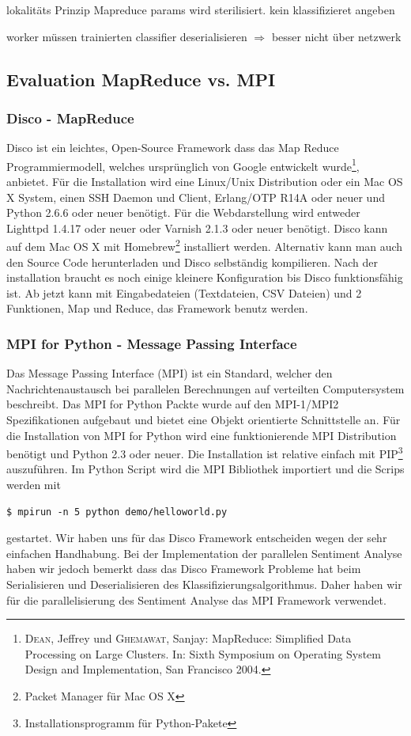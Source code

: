 \documentclass[12pt, oneside]{report}   	%
\begin{document}
lokalitäts Prinzip Mapreduce params wird sterilisiert. kein klassifizieret angeben

worker müssen trainierten classifier deserialisieren $\Rightarrow$ besser nicht über netzwerk
\subsection{Evaluation MapReduce vs. MPI}
\subsubsection{Disco - MapReduce}
Disco ist ein leichtes, Open-Source Framework dass das Map Reduce Programmiermodell, welches ursprünglich von Google entwickelt wurde\footnote{\textsc{Dean}, Jeffrey und \textsc{Ghemawat}, Sanjay: MapReduce: Simplified Data Processing on Large Clusters. In: Sixth Symposium on Operating System Design and Implementation, San Francisco 2004.}, anbietet. Für die Installation wird eine Linux/Unix Distribution oder ein Mac OS X System, einen SSH Daemon und Client, Erlang/OTP R14A oder neuer und Python 2.6.6 oder neuer benötigt. Für die Webdarstellung wird entweder Lighttpd 1.4.17 oder neuer oder Varnish 2.1.3 oder neuer benötigt. Disco kann auf dem Mac OS X mit Homebrew\footnote{Packet Manager für Mac OS X} installiert werden. Alternativ kann man auch den Source Code herunterladen und Disco selbständig kompilieren. Nach der installation braucht es noch einige kleinere Konfiguration bis Disco funktionsfähig ist. Ab jetzt kann mit Eingabedateien (Textdateien, CSV Dateien) und 2 Funktionen, Map und Reduce, das Framework benutz werden.
\subsubsection{MPI for Python - Message Passing Interface}
Das Message Passing Interface (MPI) ist ein Standard, welcher den Nachrichtenaustausch bei parallelen Berechnungen auf verteilten Computersystem beschreibt. Das MPI for Python Packte wurde auf den MPI-1/MPI2 Spezifikationen aufgebaut und bietet eine Objekt orientierte Schnittstelle an. Für die Installation von MPI for Python wird eine funktionierende MPI Distribution benötigt und Python 2.3 oder neuer. Die Installation ist relative einfach mit PIP\footnote{Installationsprogramm für Python-Pakete} auszuführen. Im Python Script wird die MPI Bibliothek importiert und die Scrips werden mit
\begin{lstlisting}
$ mpirun -n 5 python demo/helloworld.py
\end{lstlisting}
gestartet.\newline{}
Wir haben uns für das Disco Framework entscheiden wegen der sehr einfachen Handhabung. Bei der Implementation der parallelen Sentiment Analyse haben wir jedoch bemerkt dass das Disco Framework Probleme hat beim Serialisieren und Deserialisieren des Klassifizierungsalgorithmus. Daher haben wir für die parallelisierung des Sentiment Analyse das MPI Framework verwendet.
\end{document}
